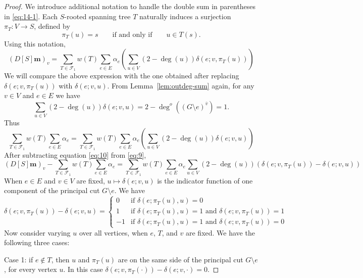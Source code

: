 \documentclass{amsart}
\theoremstyle{definition}
\newcommand{\boldm}{\mathbf{m}}
\newcommand{\trees}{\mathcal{F}_1}
\newcommand{\degout}{\deg^o}
\begin{document}
\begin{proof}
We introduce additional notation to handle the double sum in parentheses in \eqref{eq:14-1}.
Each $S$-rooted spanning tree $T$ naturally induces a surjection $\pi_T: V \to S$, defined by 
\[
	\pi_T(u) = s \qquad\text{if and only if}\qquad u \in T(s).
\]
Using this notation,
\begin{equation}
\label{eq:9}
	(D[S] \boldm)_v = \sum_{T \in \trees} w(T) \sum_{e \in E} \alpha_e \left( \sum_{u \in V} (2 - \deg(u)) \delta(e; v,\pi_T(u)) \right)
\end{equation}
We will compare the above expression with the one obtained after replacing $\delta(e; v,\pi_T(u))$ with $\delta(e; v, u)$.
From Lemma~\ref{lem:outdeg-sum} again, for any $v \in V$ and $e \in E$ we have
\[
	\sum_{u \in V} (2 - \deg(u)) \delta(e; v,u) = 2 - \degout((G\setminus e)^{\overline v}) = 1. 
\] 
Thus
\begin{equation}
\label{eq:10}
	\sum_{T \in \trees} w(T) \sum_{e \in E} \alpha_e
	= \sum_{T \in \trees} w(T) \sum_{e \in E} \alpha_e \left( \sum_{u \in V} (2 - \deg(u)) \delta(e; v,u) \right) 
\end{equation}
After subtracting equation \eqref{eq:10} from \eqref{eq:9},
\[
	(D[S] \boldm)_v - \sum_{T \in \trees} w(T) \sum_{e \in E} \alpha_e = \sum_{T \in \trees} w(T) \sum_{e \in E} \alpha_e \sum_{u \in V} (2 - \deg(u)) \left(\delta(e; v, \pi_T(u)) - \delta(e; v, u) \right)
\]
When $e \in E$ and $v \in V$ are fixed, $u \mapsto \delta(e; v, u)$ is the indicator function of one component of the principal cut $G \setminus e$.
We have
\begin{equation}
\label{eq:delta-diff}
	\delta(e; v, \pi_T(u)) - \delta(e; v, u) = \begin{cases}
	0 &\text{if } \delta(e; \pi_T(u), u) = 0 \\
	1 &\text{if } \delta(e; \pi_T(u), u) = 1 \text{ and } \delta(e; v, \pi_T(u)) = 1 \\
	-1 &\text{if } \delta(e; \pi_T(u), u) = 1 \text{ and } \delta(e; v, \pi_T(u)) = 0
	\end{cases}
\end{equation}
Now consider varying $u$ over all vertices, when $e$, $T$, and $v$ are fixed.
We have the following three cases:

Case 1: if $e \not \in T$, then $u$ and $\pi_T(u)$ are on the same side of the principal cut $G \setminus e$, for every vertex $u$.
In this case $\delta(e;v, \pi_T(\cdot)) - \delta(e; v, \cdot) = 0$.


\end{proof}
\end{document}
